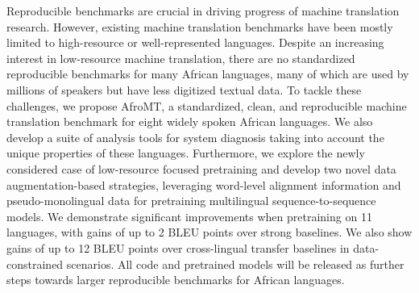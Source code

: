 Reproducible benchmarks are crucial in driving progress of machine translation research. However, existing machine translation benchmarks have been mostly limited to high-resource or well-represented languages. Despite an increasing interest in low-resource machine translation, there are no standardized reproducible benchmarks for many African languages, many of which are used by millions of speakers but have less digitized textual data. To tackle these challenges, we propose AfroMT, a standardized, clean, and reproducible machine translation benchmark for eight widely spoken African languages. We also develop a suite of analysis tools for system diagnosis taking into account the unique properties of these languages. Furthermore, we explore the newly considered case of low-resource focused pretraining and develop two novel data augmentation-based strategies, leveraging word-level alignment information and pseudo-monolingual data for pretraining multilingual sequence-to-sequence models. We demonstrate significant improvements when pretraining on 11 languages, with gains of up to 2 BLEU points over strong baselines. We also show gains of up to 12 BLEU points over cross-lingual transfer baselines in data-constrained scenarios. All code and pretrained models will be released as further steps towards larger reproducible benchmarks for African languages.
